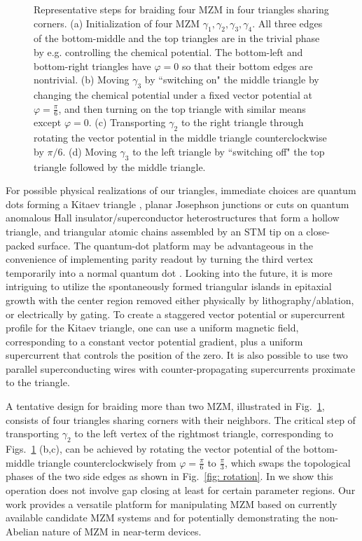 \begin{figure}[!hb]
\begin{tikzpicture}
  \end{tikzpicture}
  \caption{Representative steps for braiding four MZM in four triangles sharing corners. (a) Initialization of four MZM $\gamma_1, \gamma_2, \gamma_3, \gamma_4$. All three edges of the bottom-middle and the top triangles are in the trivial phase by e.g. controlling the chemical potential. The bottom-left and bottom-right triangles have $\varphi = 0$ so that their bottom edges are nontrivial. (b) Moving $\gamma_3$ by ``switching on" the middle triangle by changing the chemical potential under a fixed vector potential at $\varphi=\frac{\pi}{6}$, and then turning on the top triangle with similar means except $\varphi = 0$. (c) Transporting $\gamma_2$ to the right triangle through rotating the vector potential in the middle triangle counterclockwise by $\pi/6$. (d) Moving $\gamma_3$ to the left triangle by ``switching off" the top triangle followed by the middle triangle.}
  \label{fig:4MZMbraiding}
\end{figure}

For possible physical realizations of our triangles, immediate choices are quantum dots forming a Kitaev triangle \cite{dvirRealizationMinimalKitaev2023}, planar Josephson junctions or cuts on quantum anomalous Hall insulator/superconductor heterostructures \cite{xieCreatingLocalizedMajorana2021} that form a hollow triangle, and triangular atomic chains assembled by an STM tip \cite{schneiderPrecursorsMajoranaModes2022} on a close-packed surface. The quantum-dot platform may be advantageous in the convenience of implementing parity readout by turning the third vertex temporarily into a normal quantum dot \cite{mishmashDephasingLeakageDynamics2020,parity_QD_readout_2020, fengProbingRobustMajorana2022}. Looking into the future, it is more intriguing to utilize the spontaneously formed triangular islands in epitaxial growth \cite{pietzschSpinResolvedElectronicStructure2006} with the center region removed either physically by lithography/ablation, or electrically by gating. To create a staggered vector potential or supercurrent profile for the Kitaev triangle, one can use a uniform magnetic field, corresponding to a constant vector potential gradient, plus a uniform supercurrent that controls the position of the zero. It is also possible to use two parallel superconducting wires with counter-propagating supercurrents proximate to the triangle.

A tentative design for braiding more than two MZM, illustrated in Fig.~\ref{fig:4MZMbraiding}, consists of four triangles sharing corners with their neighbors. The critical step of transporting $\gamma_2$ to the left vertex of the rightmost triangle, corresponding to Figs.~\ref{fig:4MZMbraiding} (b,c), can be achieved by rotating the vector potential of the bottom-middle triangle counterclockwisely from $\varphi = \frac{\pi}{6}$ to $\frac{\pi}{3}$, which swaps the topological phases of the two side edges as shown in Fig.~\ref{fig: rotation}. In \cite{supp} we show this operation does not involve gap closing at least for certain parameter regions. Our work provides a versatile platform for manipulating MZM based on currently available candidate MZM systems and for potentially demonstrating the non-Abelian nature of MZM in near-term devices.
